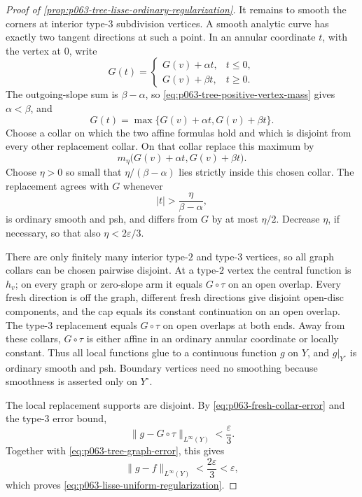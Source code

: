 \begin{proof}[Proof of
\cref{prop:p063-tree-lisse-ordinary-regularization}]
It remains to smooth the corners at interior type-\(3\) subdivision
vertices.  A smooth analytic curve has exactly two tangent directions at
such a point.  In an annular coordinate \(t\), with the vertex at \(0\),
write
\[
 G(t)=
 \begin{cases}
  G(v)+\alpha t,&t\leq0,\\
  G(v)+\beta t,&t\geq0.
 \end{cases}
\]
The outgoing-slope sum is \(\beta-\alpha\), so
\eqref{eq:p063-tree-positive-vertex-mass} gives \(\alpha<\beta\), and
\[
 G(t)=\max\{G(v)+\alpha t,G(v)+\beta t\}.
\]
Choose a collar on which the two affine formulas hold and which is disjoint
from every other replacement collar.  On that collar replace this maximum
by
\[
 m_\eta\bigl(G(v)+\alpha t,G(v)+\beta t\bigr).
\]
Choose \(\eta>0\) so small that
\(\eta/(\beta-\alpha)\) lies strictly inside this chosen collar.  The
replacement agrees with \(G\) whenever
\[
                         |t|>\frac{\eta}{\beta-\alpha},
\]
is ordinary smooth and psh, and differs from \(G\) by at most
\(\eta/2\).  Decrease \(\eta\), if necessary, so that also
\(\eta<2\varepsilon/3\).

There are only finitely many interior type-\(2\) and type-\(3\) vertices,
so all graph collars can be chosen pairwise disjoint.  At a type-\(2\)
vertex the central function is \(h_v\); on every graph or zero-slope arm
it equals \(G\circ\tau\) on an open overlap.  Every fresh direction is
off the graph, different fresh directions give disjoint open-disc
components, and the cap equals its constant continuation on an open
overlap.  The type-\(3\) replacement equals \(G\circ\tau\) on open
overlaps at both ends.  Away from these collars,
\(G\circ\tau\) is either affine in an ordinary annular coordinate or
locally constant.  Thus all local functions glue to a continuous
function \(g\) on \(Y\), and \(g|_{Y^\circ}\) is ordinary smooth and psh.
Boundary vertices need no smoothing because smoothness is asserted only
on \(Y^\circ\).

The local replacement supports are disjoint.  By
\eqref{eq:p063-fresh-collar-error} and the type-\(3\) error bound,
\[
                \lVert g-G\circ\tau\rVert_{L^\infty(Y)}
                    <\frac{\varepsilon}{3}.
\]
Together with \eqref{eq:p063-tree-graph-error}, this gives
\[
                         \lVert g-f\rVert_{L^\infty(Y)}
                         <\frac{2\varepsilon}{3}<\varepsilon,
\]
which proves \eqref{eq:p063-lisse-uniform-regularization}.
\end{proof}

